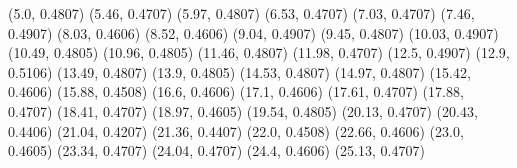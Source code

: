 (5.0, 0.4807)
(5.46, 0.4707)
(5.97, 0.4807)
(6.53, 0.4707)
(7.03, 0.4707)
(7.46, 0.4907)
(8.03, 0.4606)
(8.52, 0.4606)
(9.04, 0.4907)
(9.45, 0.4807)
(10.03, 0.4907)
(10.49, 0.4805)
(10.96, 0.4805)
(11.46, 0.4807)
(11.98, 0.4707)
(12.5, 0.4907)
(12.9, 0.5106)
(13.49, 0.4807)
(13.9, 0.4805)
(14.53, 0.4807)
(14.97, 0.4807)
(15.42, 0.4606)
(15.88, 0.4508)
(16.6, 0.4606)
(17.1, 0.4606)
(17.61, 0.4707)
(17.88, 0.4707)
(18.41, 0.4707)
(18.97, 0.4605)
(19.54, 0.4805)
(20.13, 0.4707)
(20.43, 0.4406)
(21.04, 0.4207)
(21.36, 0.4407)
(22.0, 0.4508)
(22.66, 0.4606)
(23.0, 0.4605)
(23.34, 0.4707)
(24.04, 0.4707)
(24.4, 0.4606)
(25.13, 0.4707)
